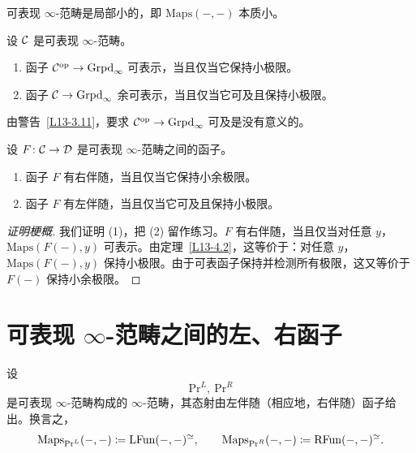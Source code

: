 \begin{exercise}\label{L13-4.1}
可表现 $\infty$-范畴是局部小的，即 $\mathrm{Maps}(-,-)$ 本质小。
\end{exercise}

\begin{theorem}[HTT.5.5.2.2, 5.5.2.7]\label{L13-4.2}
设 $\mathcal{C}$ 是可表现 $\infty$-范畴。
\begin{enumerate}[label=(\arabic*),leftmargin=2.4em,itemsep=0.1em]
\item 函子 $\mathcal{C}^{\mathrm{op}}\to\operatorname{Grpd}_\infty$ 可表示，当且仅当它保持小极限。
\item 函子 $\mathcal{C}\to\operatorname{Grpd}_\infty$ 余可表示，当且仅当它可及且保持小极限。
\end{enumerate}
\end{theorem}

\begin{remark}\label{L13-4.3}
由警告~\ref{L13-3.11}，要求 $\mathcal{C}^{\mathrm{op}}\to\operatorname{Grpd}_\infty$ 可及是没有意义的。
\end{remark}

\begin{corollary}\label{L13-4.4}
设 $F\colon\mathcal{C}\to\mathcal{D}$ 是可表现 $\infty$-范畴之间的函子。
\begin{enumerate}[label=(\arabic*),leftmargin=2.4em,itemsep=0.1em]
\item 函子 $F$ 有右伴随，当且仅当它保持小余极限。
\item 函子 $F$ 有左伴随，当且仅当它可及且保持小极限。
\end{enumerate}
\end{corollary}


\begin{proof}[证明梗概]
我们证明 (1)，把 (2) 留作练习。$F$ 有右伴随，当且仅当对任意 $y$，$\mathrm{Maps}(F(-),y)$ 可表示。由定理~\ref{L13-4.2}，这等价于：对任意 $y$，$\mathrm{Maps}(F(-),y)$ 保持小极限。由于可表函子保持并检测所有极限，这又等价于 $F(-)$ 保持小余极限。
\end{proof}

\section{可表现 $\infty$-范畴之间的左、右函子}

\begin{definition}\label{L13-5.1}
设
\[
\mathrm{Pr}^{L},\ \mathrm{Pr}^{R}
\]
是可表现 $\infty$-范畴构成的 $\infty$-范畴，其态射由左伴随（相应地，右伴随）函子给出。换言之，
\[
\mathrm{Maps}_{\mathrm{Pr}^{L}}(-,-)\coloneqq\mathrm{LFun}(-,-)^{\simeq},\qquad
\mathrm{Maps}_{\mathrm{Pr}^{R}}(-,-)\coloneqq\mathrm{RFun}(-,-)^{\simeq}.
\]
\end{definition}

